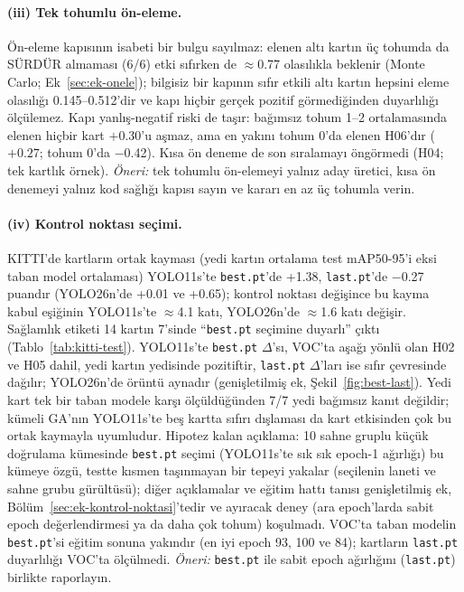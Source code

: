 \documentclass[pdflatex,iicol,sn-mathphys-num]{sn-jnl}
\begin{document}
\paragraph{(iii) Tek tohumlu ön-eleme.}
Ön-eleme kapısının isabeti bir bulgu sayılmaz: elenen altı kartın üç tohumda da SÜRDÜR almaması (6/6) etki sıfırken de $\approx$0.77 olasılıkla beklenir (Monte Carlo; Ek~\ref{sec:ek-onele}); bilgisiz bir kapının sıfır etkili altı kartın hepsini eleme olasılığı 0.145--0.512'dir ve kapı hiçbir gerçek pozitif görmediğinden duyarlılığı ölçülemez. Kapı yanlış-negatif riski de taşır: bağımsız tohum 1--2 ortalamasında elenen hiçbir kart $+0.30$'u aşmaz, ama en yakını tohum 0'da elenen H06'dır ($+0.27$; tohum 0'da $-$0.42). Kısa ön deneme de son sıralamayı öngörmedi (H04; tek kartlık örnek). \emph{Öneri:} tek tohumlu ön-elemeyi yalnız aday üretici, kısa ön denemeyi yalnız kod sağlığı kapısı sayın ve kararı en az üç tohumla verin.

\paragraph{(iv) Kontrol noktası seçimi.}
KITTI'de kartların ortak kayması (yedi kartın ortalama test mAP50-95'i eksi taban model ortalaması) YOLO11s'te \texttt{best.pt}'de +1.38, \texttt{last.pt}'de $-$0.27 puandır (YOLO26n'de +0.01 ve +0.65); kontrol noktası değişince bu kayma kabul eşiğinin YOLO11s'te $\approx$4.1 katı, YOLO26n'de $\approx$1.6 katı değişir. Sağlamlık etiketi 14 kartın 7'sinde ``\texttt{best.pt} seçimine duyarlı'' çıktı (Tablo~\ref{tab:kitti-test}). YOLO11s'te \texttt{best.pt} $\Delta$'sı, VOC'ta aşağı yönlü olan H02 ve H05 dahil, yedi kartın yedisinde pozitiftir, \texttt{last.pt} $\Delta$'ları ise sıfır çevresinde dağılır; YOLO26n'de örüntü aynadır (genişletilmiş ek, Şekil~\ref{fig:best-last}). Yedi kart tek bir taban modele karşı ölçüldüğünden 7/7 yedi bağımsız kanıt değildir; kümeli GA'nın YOLO11s'te beş kartta sıfırı dışlaması da kart etkisinden çok bu ortak kaymayla uyumludur. Hipotez kalan açıklama: 10 sahne gruplu küçük doğrulama kümesinde \texttt{best.pt} seçimi (YOLO11s'te sık sık epoch-1 ağırlığı) bu kümeye özgü, testte kısmen taşınmayan bir tepeyi yakalar (seçilenin laneti ve sahne grubu gürültüsü); diğer açıklamalar ve eğitim hattı tanısı genişletilmiş ek, Bölüm~\ref{sec:ek-kontrol-noktasi}'tedir ve ayıracak deney (ara epoch'larda sabit epoch değerlendirmesi ya da daha çok tohum) koşulmadı. VOC'ta taban modelin \texttt{best.pt}'si eğitim sonuna yakındır (en iyi epoch 93, 100 ve 84); kartların \texttt{last.pt} duyarlılığı VOC'ta ölçülmedi. \emph{Öneri:} \texttt{best.pt} ile sabit epoch ağırlığını (\texttt{last.pt}) birlikte raporlayın.
\end{document}
